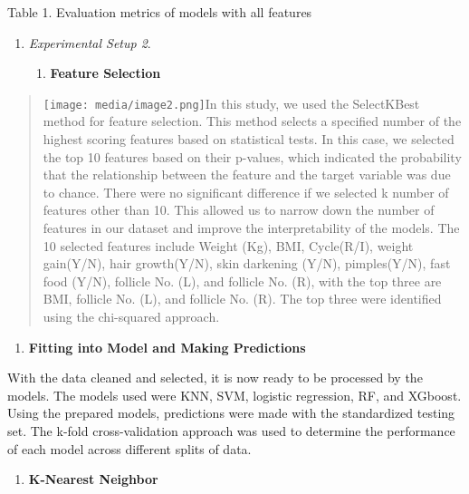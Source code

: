 \documentclass[
]{article}
\begin{document}
Table 1. Evaluation metrics of models with all features

\begin{enumerate}
\def\labelenumi{\arabic{enumi}.}
\setcounter{enumi}{3}
\item
  \emph{Experimental Setup 2}.

  \begin{enumerate}
  \def\labelenumii{\arabic{enumii}.}
  \item
    \textbf{Feature Selection}
  \end{enumerate}
\end{enumerate}

\begin{quote}
\texttt{[image: media/image2.png]}In
this study, we used the SelectKBest method for feature selection. This
method selects a specified number of the highest scoring features based
on statistical tests. In this case, we selected the top 10 features
based on their p-values, which indicated the probability that the
relationship between the feature and the target variable was due to
chance. There were no significant difference if we selected k number of
features other than 10. This allowed us to narrow down the number of
features in our dataset and improve the interpretability of the models.
The 10 selected features include Weight (Kg), BMI, Cycle(R/I), weight
gain(Y/N), hair growth(Y/N), skin darkening (Y/N), pimples(Y/N), fast
food (Y/N), follicle No. (L), and follicle No. (R), with the top three
are BMI, follicle No. (L), and follicle No. (R). The top three were
identified using the chi-squared approach.
\end{quote}

\begin{enumerate}
\def\labelenumi{\arabic{enumi}.}
\setcounter{enumi}{1}
\item
  \textbf{Fitting into Model and Making Predictions}
\end{enumerate}

With the data cleaned and selected, it is now ready to be processed by
the models. The models used were KNN, SVM, logistic regression, RF, and
XGboost. Using the prepared models, predictions were made with the
standardized testing set. The k-fold cross-validation approach was used
to determine the performance of each model across different splits of
data.

\begin{enumerate}
\def\labelenumi{\alph{enumi})}
\item
  \textbf{K-Nearest Neighbor}
\end{enumerate}
\end{document}
